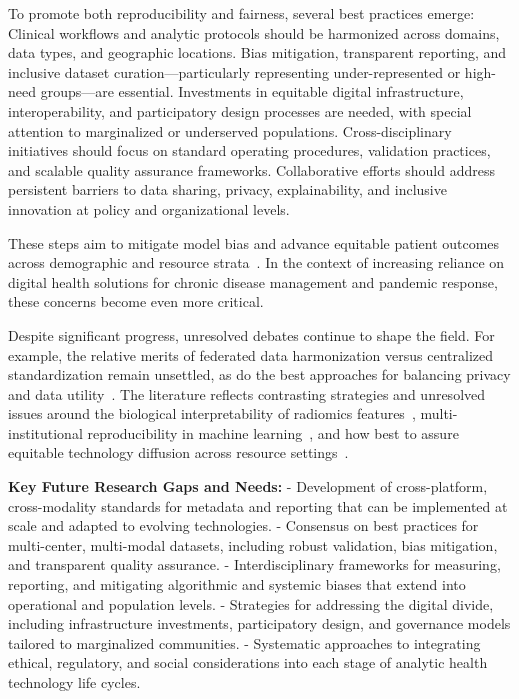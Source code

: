 \documentclass[sigconf]{acmart}
\begin{document}
To promote both reproducibility and fairness, several best practices emerge:
Clinical workflows and analytic protocols should be harmonized across domains, data types, and geographic locations.
Bias mitigation, transparent reporting, and inclusive dataset curation—particularly representing under-represented or high-need groups—are essential.
Investments in equitable digital infrastructure, interoperability, and participatory design processes are needed, with special attention to marginalized or underserved populations.
Cross-disciplinary initiatives should focus on standard operating procedures, validation practices, and scalable quality assurance frameworks.
Collaborative efforts should address persistent barriers to data sharing, privacy, explainability, and inclusive innovation at policy and organizational levels.

These steps aim to mitigate model bias and advance equitable patient outcomes across demographic and resource strata~\cite{ref44,ref45,ref50,ref55,ref60,ref61,ref64,ref65,ref66,ref67,ref74,ref75,ref78,ref79,ref80,ref84,ref90,ref106}. In the context of increasing reliance on digital health solutions for chronic disease management and pandemic response, these concerns become even more critical.

Despite significant progress, unresolved debates continue to shape the field. For example, the relative merits of federated data harmonization versus centralized standardization remain unsettled, as do the best approaches for balancing privacy and data utility~\cite{ref84,ref90,ref106}. The literature reflects contrasting strategies and unresolved issues around the biological interpretability of radiomics features~\cite{ref44,ref45}, multi-institutional reproducibility in machine learning~\cite{ref54,ref55,ref50}, and how best to assure equitable technology diffusion across resource settings~\cite{ref63,ref65,ref79,ref82}.

\textbf{Key Future Research Gaps and Needs:}
- Development of cross-platform, cross-modality standards for metadata and reporting that can be implemented at scale and adapted to evolving technologies.
- Consensus on best practices for multi-center, multi-modal datasets, including robust validation, bias mitigation, and transparent quality assurance.
- Interdisciplinary frameworks for measuring, reporting, and mitigating algorithmic and systemic biases that extend into operational and population levels.
- Strategies for addressing the digital divide, including infrastructure investments, participatory design, and governance models tailored to marginalized communities.
- Systematic approaches to integrating ethical, regulatory, and social considerations into each stage of analytic health technology life cycles.
\end{document}
